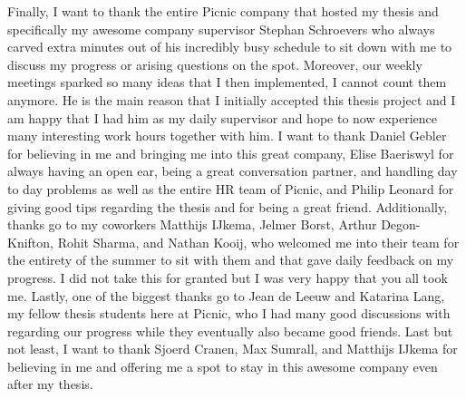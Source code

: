 Finally, I want to thank the entire Picnic company that hosted my thesis and specifically my awesome
company supervisor Stephan Schroevers who always carved extra minutes out of his incredibly busy schedule
to sit down with me to discuss my progress or arising questions on the spot. Moreover, our weekly meetings
sparked so many ideas that I then implemented, I cannot count them anymore. He is the main reason that
I initially accepted this thesis project and I am happy that I had him as my daily supervisor and hope
to now experience many interesting work hours together with him.
I want to thank Daniel Gebler for believing in me and bringing me into this great company,
Elise Baeriswyl for always having an open ear, being a great conversation partner,
and handling day to day problems as well as the entire HR team of Picnic,
and Philip Leonard for giving good tips regarding the thesis and for being a great friend.
Additionally, thanks go to my coworkers Matthijs IJkema, Jelmer Borst, Arthur Degon-Knifton, Rohit Sharma,
and Nathan Kooij, who welcomed me into their team for the entirety of the summer to sit with them
and that gave daily feedback on my progress.
I did not take this for granted but I was very happy that you all took me.
Lastly, one of the biggest thanks go to Jean de Leeuw and Katarina Lang, my fellow thesis students here
at Picnic, who I had many good discussions with regarding our progress while they eventually also became
good friends.
Last but not least, I want to thank Sjoerd Cranen, Max Sumrall, and Matthijs IJkema for believing in
me and offering me a spot to stay in this awesome company even after my thesis.

\vfill

\cleardoublepage

\raggedbottom
